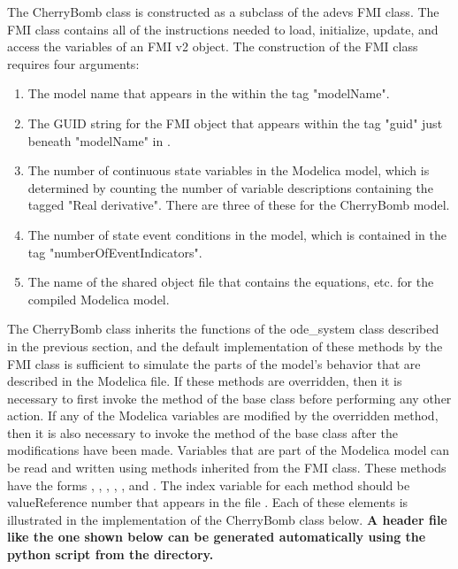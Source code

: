 The CherryBomb class is constructed as a subclass of the adevs FMI class. The FMI class contains all of the instructions needed to load, initialize, update, and access the variables of an FMI v2 object. The construction of the FMI class requires four arguments:
\begin{enumerate}
\item The model name that appears in the  within the tag "modelName".
\item The GUID string for the FMI object that appears within the tag "guid" just beneath "modelName" in .
\item The number of continuous state variables in the Modelica model, which is determined by counting the number of variable descriptions containing the tagged "Real derivative". There are three of these for the CherryBomb model.
\item The number of state event conditions in the model, which is contained in the tag "numberOfEventIndicators". 
\item The name of the shared object file that contains the equations, etc. for the compiled Modelica model.
\end{enumerate}
The CherryBomb class inherits the functions of the ode\_system class described in the previous section, and the default implementation of these methods by the FMI class is sufficient to simulate the parts of the model's behavior that are described in the Modelica file. If these methods are overridden, then it is necessary to first invoke the method of the base class before performing any other action. If any of the Modelica variables are modified by the overridden method, then it is also necessary to invoke the method of the base class after the modifications have been made. Variables that are part of the Modelica model can be read and written using methods inherited from the FMI class. These methods have the forms , , , , , and . The index variable for each method should be valueReference number that appears in the file . Each of these elements is illustrated in the implementation of the CherryBomb class below. \bf{A header file like the one shown below can be generated automatically using the  python script from the  directory.}

